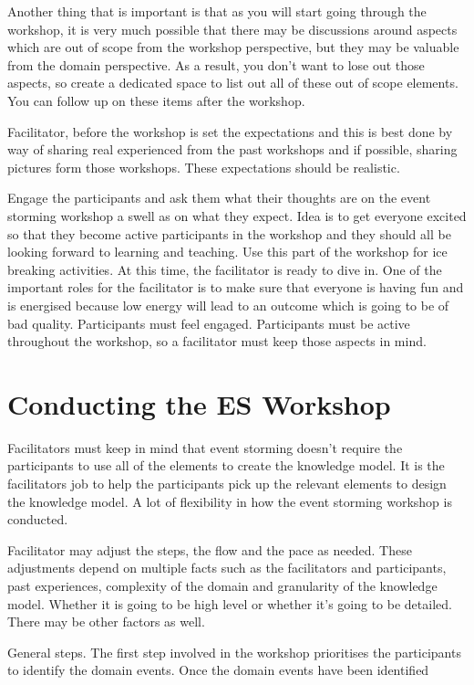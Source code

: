 \documentclass[a4paper, 11pt]{book}
\begin{document}
    Another thing that is important is that as you will start going through the workshop, it is very much possible that there may be discussions around aspects which are out of scope from the workshop perspective, but they may be valuable from the domain perspective.
    As a result, you don't want to lose out those aspects, so create a dedicated space to list out all of these out of scope elements.
    You can follow up on these items after the workshop.

    Facilitator, before the workshop is set the expectations and this is best done by way of sharing real experienced from the past workshops and if possible, sharing pictures form those workshops.
    These expectations should be realistic.

    Engage the participants and ask them what their thoughts are on the event storming workshop a swell as on what they expect.
    Idea is to get everyone excited so that they become active participants in the workshop and they should all be looking forward to learning and teaching.
    Use this part of the workshop for ice breaking activities.
    At this time, the facilitator is ready to dive in.
    One of the important roles for the facilitator is to make sure that everyone is having fun and is energised because low energy will lead to an outcome which is going to be of bad quality.
    Participants must feel engaged.
    Participants must be active throughout the workshop, so a facilitator must keep those aspects in mind.


    \section{Conducting the ES Workshop}

    Facilitators must keep in mind that event storming doesn't require the participants to use all of the elements to create the knowledge model.
    It is the facilitators job to help the participants pick up the relevant elements to design the knowledge model.
    A lot of flexibility in how the event storming workshop is conducted.

    Facilitator may adjust the steps, the flow and the pace as needed.
    These adjustments depend on multiple facts such as the facilitators and participants, past experiences, complexity of the domain and granularity of the knowledge model.
    Whether it is going to be high level or whether it's going to be detailed.
    There may be other factors as well.

    General steps.
    The first step involved in the workshop prioritises the participants to identify the domain events.
    Once the domain events have been identified
\end{document}
